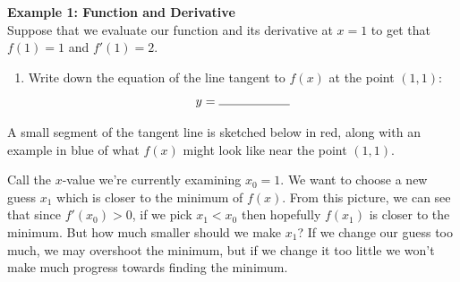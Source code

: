 \documentclass[11pt]{article}
\begin{document}
\newpage
{\bf Example 1: Function and Derivative}\\

Suppose that we evaluate our function and its derivative at $x=1$ to get that $f(1) = 1$ and $f'(1) = 2$.

\begin{enumerate}
\item Write down the equation of the line tangent to $f(x)$ at the point $(1,1)$:
\[
    y = \rule{2cm}{0.4pt}
\]
\end{enumerate}

A small segment of the tangent line is sketched below in red, along with an example in blue of what $f(x)$ might look like near the point $(1,1)$.

\begin{center}
\end{center}

Call the $x$-value we're currently examining $x_0=1$. We want to choose a new guess $x_1$ which is closer to the minimum of $f(x)$.
From this picture, we can see that since $f'(x_0)>0$, if we pick $x_1 < x_0$ then hopefully  $f(x_1)$ is closer to the minimum. But how much smaller should we make $x_1$? If we change our guess too much, we may overshoot the minimum, but if we change it too little we won't make much progress towards finding the minimum. 
\end{document}
